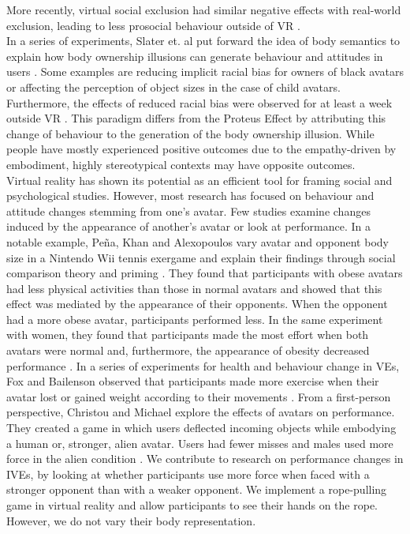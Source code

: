 More recently, virtual social exclusion had similar negative effects with real-world exclusion, leading to less prosocial behaviour outside of VR \cite{kothgassner2017real}.\\
In a series of experiments, Slater et. al put forward the idea of body semantics to explain how body ownership illusions can generate behaviour and attitudes in users \cite{slater2014transcending}. Some examples are reducing implicit racial bias for owners of black avatars or affecting the  perception of object sizes in the case of child avatars. Furthermore, the effects of reduced racial bias were observed for at least a week outside VR \cite{banakou2016virtual}. 
This paradigm differs from the Proteus Effect by attributing this change of behaviour to the generation of the body ownership illusion. While people have mostly experienced positive outcomes due to the empathy-driven by embodiment, highly stereotypical contexts may have opposite outcomes.\\
Virtual reality has shown its potential as an efficient tool for framing social and psychological studies. 
However, most research has focused on behaviour and attitude changes stemming from one's avatar. Few studies examine changes induced by the appearance of another's avatar or look at performance. In a notable example, Peña, Khan and Alexopoulos vary avatar and opponent body size in a Nintendo Wii tennis exergame and explain their findings through social comparison theory and priming \cite{pena2016see}. They found that participants with obese avatars had less physical activities than those in normal avatars and showed that this effect was mediated by the appearance of their opponents. When the opponent had a more obese avatar, participants performed less. In the same experiment with women, they found that participants made the most effort when both avatars were normal and, furthermore, the appearance of obesity decreased performance \cite{pena2014increasing}. In a series of experiments for health and behaviour change in VEs, Fox and Bailenson observed that participants made more exercise when their avatar lost or gained weight according to their movements \cite{fox2009virtual}. From a first-person perspective, Christou and Michael explore the effects of avatars on performance. They created a game in which users deflected incoming objects while embodying a human or, stronger, alien avatar. Users had fewer misses and males used more force in the alien condition \cite{christou2014aliens}. We contribute to research on performance changes in IVEs, by looking at whether participants  use more force when faced with a stronger opponent than with a weaker opponent. We implement a rope-pulling game in virtual reality and allow participants to see their hands on the rope. However, we do not vary their body representation.
 
